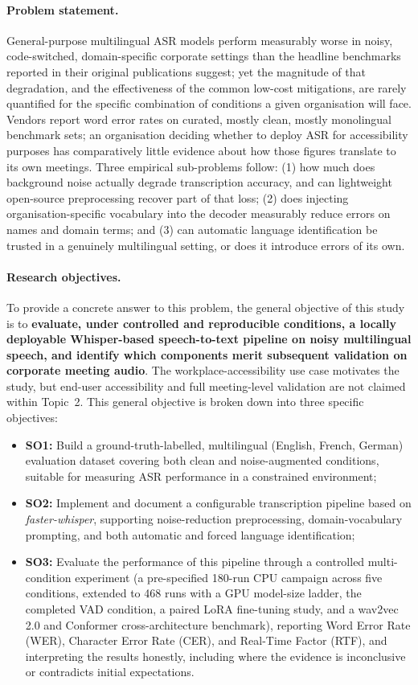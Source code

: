 \documentclass[12pt]{report}
\begin{document}
\paragraph{Problem statement.}
General-purpose multilingual ASR models perform measurably worse in noisy, code-switched, domain-specific corporate settings than the headline benchmarks reported in their original publications suggest; yet the magnitude of that degradation, and the effectiveness of the common low-cost mitigations, are rarely quantified for the specific combination of conditions a given organisation will face. Vendors report word error rates on curated, mostly clean, mostly monolingual benchmark sets; an organisation deciding whether to deploy ASR for accessibility purposes has comparatively little evidence about how those figures translate to its own meetings. Three empirical sub-problems follow: (1) how much does background noise actually degrade transcription accuracy, and can lightweight open-source preprocessing recover part of that loss; (2) does injecting organisation-specific vocabulary into the decoder measurably reduce errors on names and domain terms; and (3) can automatic language identification be trusted in a genuinely multilingual setting, or does it introduce errors of its own.
\paragraph{Research objectives.}
To provide a concrete answer to this problem, the general objective of this study is to \textbf{evaluate, under controlled and reproducible conditions, a locally deployable Whisper-based speech-to-text pipeline on noisy multilingual speech, and identify which components merit subsequent validation on corporate meeting audio}. The workplace-accessibility use case motivates the study, but end-user accessibility and full meeting-level validation are not claimed within Topic~2. This general objective is broken down into three specific objectives:
\begin{itemize}
    \item \textbf{SO1:} Build a ground-truth-labelled, multilingual (English, French, German) evaluation dataset covering both clean and noise-augmented conditions, suitable for measuring ASR performance in a constrained environment;
    \item \textbf{SO2:} Implement and document a configurable transcription pipeline based on \textit{faster-whisper}, supporting noise-reduction preprocessing, domain-vocabulary prompting, and both automatic and forced language identification;
    \item \textbf{SO3:} Evaluate the performance of this pipeline through a controlled multi-condition experiment (a pre-specified 180-run CPU campaign across five conditions, extended to 468 runs with a GPU model-size ladder, the completed VAD condition, a paired LoRA fine-tuning study, and a wav2vec 2.0 and Conformer cross-architecture benchmark), reporting Word Error Rate (WER), Character Error Rate (CER), and Real-Time Factor (RTF), and interpreting the results honestly, including where the evidence is inconclusive or contradicts initial expectations.
\end{itemize}
\end{document}
